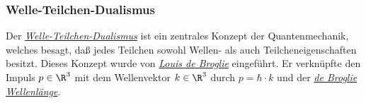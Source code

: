 \documentclass{article}
\begin{document}
        \subsubsection*{Welle-Teilchen-Dualismus}
            Der \href{https://de.wikipedia.org/wiki/Welle-Teilchen-Dualismus}{\emph{Welle-Teilchen-Dualismus}} ist ein zentrales Konzept der Quantenmechanik, welches besagt, daß jedes Teilchen sowohl Wellen- als auch Teilcheneigenschaften besitzt. Dieses Konzept wurde von \href{https://de.wikipedia.org/wiki/Louis_de_Broglie}{\emph{Louis de Broglie}} eingeführt. Er verknüpfte den Impuls $p\in\R^3$ mit dem Wellenvektor $k\in\R^3$ durch $p = \hbar\cdot k$ und der \href{https://de.wikipedia.org/wiki/Materiewelle}{\emph{de Broglie Wellenlänge}}. 
\end{document}

